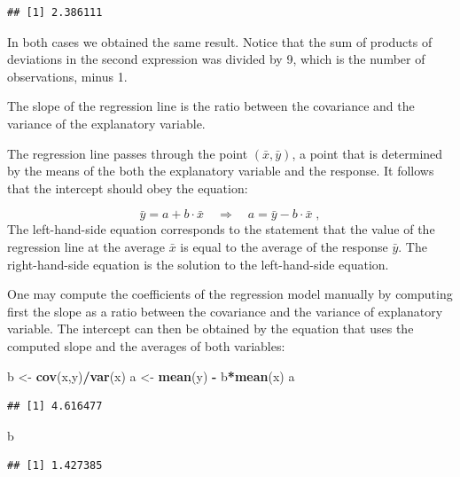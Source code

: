 \documentclass[
]{krantz}
\makeatletter
\newenvironment{Shaded}{\begin{snugshade}}{\end{snugshade}}
\newcommand{\KeywordTok}[1]{\textcolor[rgb]{0.13,0.29,0.53}{\textbf{#1}}}
\newcommand{\NormalTok}[1]{#1}
\newcommand{\OperatorTok}[1]{\textcolor[rgb]{0.81,0.36,0.00}{\textbf{#1}}}
\newcommand{\StringTok}[1]{\textcolor[rgb]{0.31,0.60,0.02}{#1}}
\newenvironment{kframe}{%
\medskip{}
\setlength{\fboxsep}{.8em}
 \def\at@end@of@kframe{}%
 \ifinner\ifhmode%
  \def\at@end@of@kframe{\end{minipage}}%
  \begin{minipage}{\columnwidth}%
 \fi\fi%
 \def\FrameCommand##1{\hskip\@totalleftmargin \hskip-\fboxsep
 \colorbox{shadecolor}{##1}\hskip-\fboxsep
     \hskip-\linewidth \hskip-\@totalleftmargin \hskip\columnwidth}%
 \MakeFramed {\advance\hsize-\width
   \@totalleftmargin\z@ \linewidth\hsize
   \@setminipage}}%
 {\par\unskip\endMakeFramed%
 \at@end@of@kframe}
\renewenvironment{Shaded}{\begin{kframe}}{\end{kframe}}
\theoremstyle{definition}
\theoremstyle{definition}
\theoremstyle{definition}
\theoremstyle{remark}
\makeatother
\begin{document}
\begin{verbatim}
## [1] 2.386111
\end{verbatim}

In both cases we obtained the same result. Notice that the sum of
products of deviations in the second expression was divided by 9, which
is the number of observations, minus 1.

The slope of the regression line is the ratio between the covariance and
the variance of the explanatory variable.

The regression line passes through the point \((\bar x, \bar y)\), a point
that is determined by the means of the both the explanatory variable and
the response. It follows that the intercept should obey the equation:

\[\bar y = a + b\cdot \bar x \quad\Longrightarrow\quad a = \bar y - b\cdot \bar x\;,\]
The left-hand-side equation corresponds to the statement that the value
of the regression line at the average \(\bar x\) is equal to the average
of the response \(\bar y\). The right-hand-side equation is the solution
to the left-hand-side equation.

One may compute the coefficients of the regression model manually by
computing first the slope as a ratio between the covariance and the
variance of explanatory variable. The intercept can then be obtained by
the equation that uses the computed slope and the averages of both
variables:

\begin{Shaded}
\begin{Highlighting}[]
\NormalTok{b <-}\StringTok{ }\KeywordTok{cov}\NormalTok{(x,y)}\OperatorTok{/}\KeywordTok{var}\NormalTok{(x)}
\NormalTok{a <-}\StringTok{ }\KeywordTok{mean}\NormalTok{(y) }\OperatorTok{-}\StringTok{ }\NormalTok{b}\OperatorTok{*}\KeywordTok{mean}\NormalTok{(x)}
\NormalTok{a}
\end{Highlighting}
\end{Shaded}

\begin{verbatim}
## [1] 4.616477
\end{verbatim}

\begin{Shaded}
\begin{Highlighting}[]
\NormalTok{b}
\end{Highlighting}
\end{Shaded}

\begin{verbatim}
## [1] 1.427385
\end{verbatim}
\end{document}
